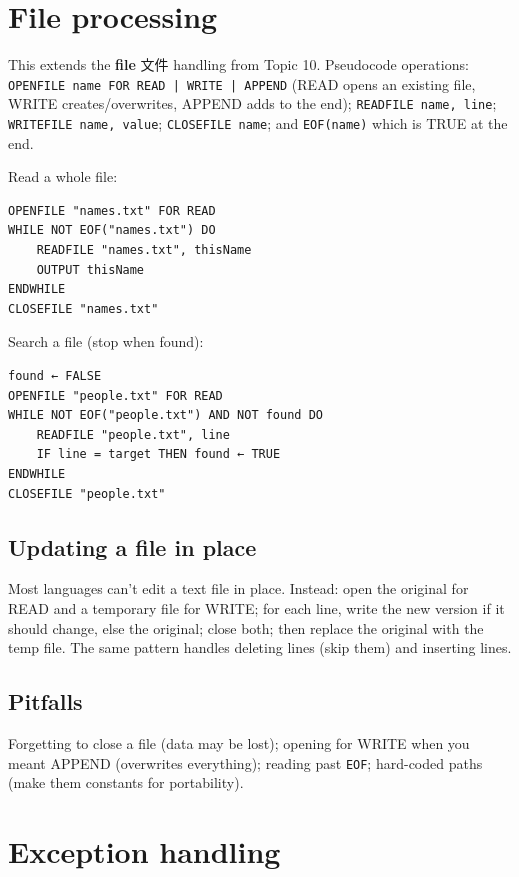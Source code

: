 \documentclass[11pt]{article}
\begin{document}
\section*{File processing}

This extends the \textbf{file} 文件 handling from Topic 10. Pseudocode operations: \texttt{OPENFILE name FOR READ | WRITE | APPEND} (READ opens an existing file, WRITE creates/overwrites, APPEND adds to the end); \texttt{READFILE name, line}; \texttt{WRITEFILE name, value}; \texttt{CLOSEFILE name}; and \texttt{EOF(name)} which is TRUE at the end.

Read a whole file:

\begin{Verbatim}
OPENFILE "names.txt" FOR READ
WHILE NOT EOF("names.txt") DO
    READFILE "names.txt", thisName
    OUTPUT thisName
ENDWHILE
CLOSEFILE "names.txt"
\end{Verbatim}

Search a file (stop when found):

\begin{Verbatim}
found ← FALSE
OPENFILE "people.txt" FOR READ
WHILE NOT EOF("people.txt") AND NOT found DO
    READFILE "people.txt", line
    IF line = target THEN found ← TRUE
ENDWHILE
CLOSEFILE "people.txt"
\end{Verbatim}

\subsection*{Updating a file in place}

Most languages can't edit a text file in place. Instead: open the original for READ and a temporary file for WRITE; for each line, write the new version if it should change, else the original; close both; then replace the original with the temp file. The same pattern handles deleting lines (skip them) and inserting lines.

\subsection*{Pitfalls}

Forgetting to close a file (data may be lost); opening for WRITE when you meant APPEND (overwrites everything); reading past \texttt{EOF}; hard-coded paths (make them constants for portability).

\section*{Exception handling}
\end{document}
